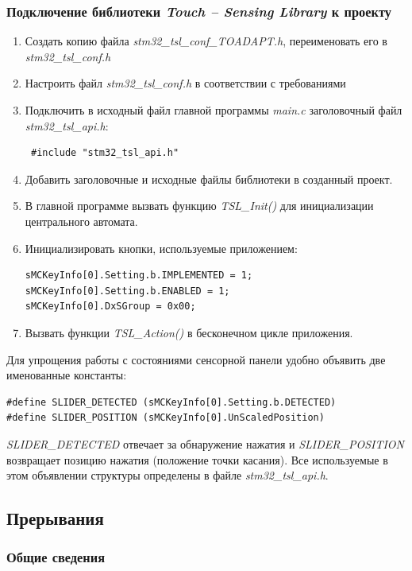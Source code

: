 \subsubsection{Подключение библиотеки \textit{Touch --  Sensing Library} к проекту}
\begin{enumerate}
\item Создать копию файла \textit{stm32\_tsl\_conf\_TOADAPT.h}, переименовать его в \textit{stm32\_tsl\_conf.h}
\item Настроить файл \textit{stm32\_tsl\_conf.h} в соответствии с требованиями
\item Подключить в исходный файл главной программы \textit{main.c} заголовочный файл\textit{ stm32\_tsl\_api.h}:
\begin{verbatim}
 #include "stm32_tsl_api.h"
\end{verbatim} 

\item Добавить заголовочные и исходные файлы библиотеки в созданный проект.
\item В главной программе вызвать функцию \textit{TSL\_Init()} для инициализации центрального автомата.
\item Инициализировать кнопки, используемые приложением:
\begin{verbatim}
sMCKeyInfo[0].Setting.b.IMPLEMENTED = 1;
sMCKeyInfo[0].Setting.b.ENABLED = 1;
sMCKeyInfo[0].DxSGroup = 0x00; 
\end{verbatim}
\item Вызвать функции \textit{TSL\_Action()} в бесконечном цикле приложения.
\end{enumerate}
Для упрощения работы с состояниями сенсорной панели удобно объявить две именованные константы:
\begin{verbatim}
#define SLIDER_DETECTED (sMCKeyInfo[0].Setting.b.DETECTED)
#define SLIDER_POSITION (sMCKeyInfo[0].UnScaledPosition)
\end{verbatim}
\textit{SLIDER\_DETECTED} отвечает за обнаружение нажатия и \textit{SLIDER\_POSITION} возвращает позицию нажатия (положение точки касания). Все используемые в этом объявлении структуры определены в файле \textit{stm32\_tsl\_api.h}.

\subsection{Прерывания}
\subsubsection{Общие сведения}

